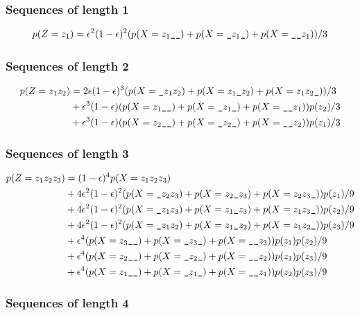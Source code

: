 \subsubsection{Sequences of length 1}

\begin{equation*}
  p(Z=z_1) = \e^2(1-\e)^2(p(X=z_1\s\s) + p(X=\s z_1\s) + p(X=\s\s z_1)) / 3
\end{equation*}

\subsubsection{Sequences of length 2}

\begin{equation*}
  \begin{split}
    p(Z=z_1z_2)
        &= 2\e(1-\e)^3(p(X=\s z_1z_2) + p(X=z_1\s z_2) + p(X=z_1z_2\s))/3\\
        &+ \e^3(1-\e)(p(X=z_1\s\s) + p(X=\s z_1\s) + p(X=\s\s z_1))p(z_2)/3\\
        &+ \e^3(1-\e)(p(X=z_2\s\s) + p(X=\s z_2\s) + p(X=\s\s z_2))p(z_1)/3
  \end{split}
\end{equation*}

\subsubsection{Sequences of length 3}

\begin{equation*}
  \begin{split}
    p(Z=z_1z_2z_3) &= (1-\e)^4 p(X=z_1z_2z_3)\\
        &+ 4\e^2(1-\e)^2 (p(X=\s z_2 z_3) + p(X=z_2\s z_3) + p(X=z_2 z_3\s))p(z_1)/9\\
        &+ 4\e^2(1-\e)^2 (p(X=\s z_1 z_3) + p(X=z_1\s z_3) + p(X=z_1 z_3\s))p(z_2)/9\\
        &+ 4\e^2(1-\e)^2 (p(X=\s z_1 z_2) + p(X=z_1\s z_2) + p(X=z_1 z_2\s))p(z_3)/9\\
        &+ \e^4 (p(X=z_3\s\s) + p(X=\s z_3\s) + p(X=\s\s z_3))p(z_1)p(z_2)/9\\
        &+ \e^4 (p(X=z_2\s\s) + p(X=\s z_2\s) + p(X=\s\s z_2))p(z_1)p(z_3)/9\\
        &+ \e^4 (p(X=z_1\s\s) + p(X=\s z_1\s) + p(X=\s\s z_1))p(z_2)p(z_3)/9
  \end{split}
\end{equation*}

\subsubsection{Sequences of length 4}

